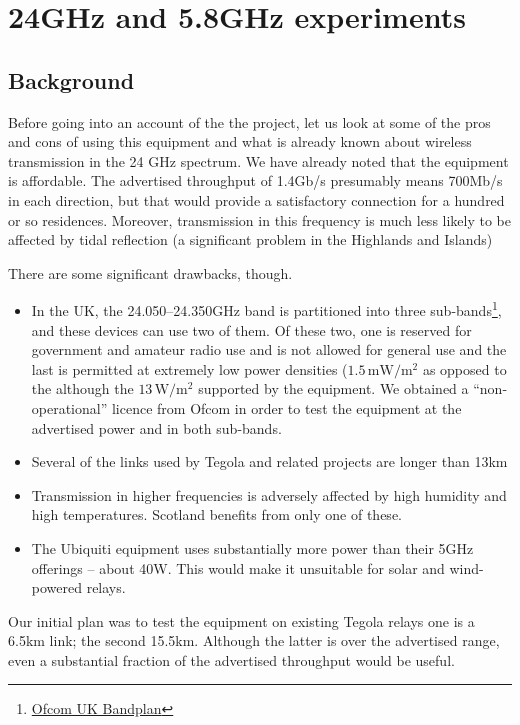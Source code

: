 \section{24GHz and 5.8GHz experiments}\label{ghz-experiments}

\subsection{Background}\label{background}

Before going into an account of the the project, let us look at some of
the pros and cons of using this equipment and what is already
known about wireless transmission in the 24 GHz spectrum. We have
already noted that the equipment is affordable. The advertised
throughput of 1.4Gb/s presumably means 700Mb/s in each direction, but
that would provide a satisfactory connection for a hundred or
so residences. Moreover, transmission in this frequency is much
less likely to be affected by tidal reflection (a significant problem
in the Highlands and Islands)

There are some significant drawbacks, though.

\begin{itemize}
\item
  In the UK, the 24.050--24.350GHz band is partitioned into three
  sub-bands\footnote{\href{http://www.ofcom.org.uk/static/archive/ra/publication/ra_info/ra365.htm}{Ofcom
    UK Bandplan}}, and these devices can use two of them. Of these two, one
  is reserved for government and amateur radio use and is not allowed
  for general use and the last is permitted at extremely low power
  densities ($1.5\,\text{mW}/\text{m}^2$ as opposed to the although
  the $13\,\text{W}/\text{m}^2$
  supported by the equipment.  We obtained a ``non-operational''
  licence from Ofcom in order to test the equipment at the advertised
  power and in both sub-bands.
\item
  Several of the links used by Tegola and related projects are longer 
  than 13km
\item
  Transmission in higher frequencies is adversely affected by high 
  humidity and high temperatures. Scotland benefits from only one of 
  these.
\item
  The Ubiquiti equipment uses substantially more power than their 5GHz 
  offerings -- about 40W. This would make it unsuitable for solar and 
  wind-powered relays.
\end{itemize}

Our initial plan was to test the equipment on existing Tegola
relays one is a 6.5km link; the second 15.5km. Although the latter is
over the advertised range, even a substantial fraction of the
advertised throughput would be useful.

